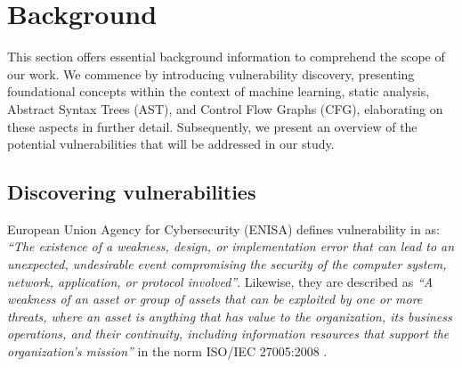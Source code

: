 % 
%  
%

\chapter{Background}
\label{cha:background_chapter}

This section offers essential background information to comprehend the scope of our work. We commence by introducing vulnerability discovery, presenting foundational concepts within the context of machine learning, static analysis, Abstract Syntax Trees (AST), and Control Flow Graphs (CFG), elaborating on these aspects in further detail. Subsequently, we present an overview of the potential vulnerabilities that will be addressed in our study.


\section{Discovering vulnerabilities} %
\label{sec:	Discovering_vulnerabilities}

European Union Agency for Cybersecurity (ENISA) \cite{Wikipedia_ENISA} defines vulnerability in \cite{ENISA} as: \textit{``The existence of a weakness, design, or implementation error that can lead to an unexpected, undesirable event compromising the security of the computer system, network, application, or protocol involved''}. Likewise, they are described as \textit{``A weakness of an asset or group of assets that can be exploited by one or more threats, where an asset is anything that has value to the organization, its business operations, and their continuity, including information resources that support the organization's mission''} in the norm ISO/IEC 27005:2008 \cite{ISO_27005}. \\


